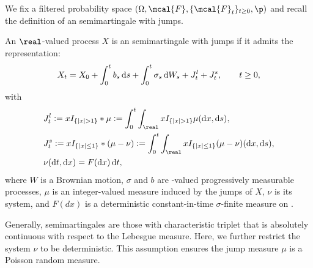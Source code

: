 We fix a filtered probability space $(\Omega, \mcal{F}, \{\mcal{F}_t\}_{t \ge 0}, \p)$ and  recall the definition of an \ito semimartingale with \levy jumps.  
\begin{defn}
  An $\real$-valued process $X$ is an \ito semimartingale with \levy jumps if it admits the representation:
  \begin{align}
    X_t = X_0 + \int^t_0 b_s \D s + \int^t_0 \sigma_s \D W_s  + J^l_t + J^s_t, \qquad t \ge 0, 
    \label{eq:semimartingale}
  \end{align}
  with 
  \begin{align}
    & J^l_t := x  I_{\{\vert x \vert > 1\}} \ast \mu := \int_0^t \int_\real x  I_{\{\vert x \vert > 1\}} \mu(\D x, \D s), \notag \\
    & J^s_t := x  I_{\{\vert x \vert \le  1\}} \ast (\mu - \nu) := \int_0^t \int_\real x  I_{\{\vert x \vert \le  1\}}(\mu - \nu)(\D x,  \D s), \notag\\
    &\nu(\D t, \D x) = F(\D x) \D t, \notag
    \label{}
  \end{align}
  where $W$ is a Brownian motion, $\sigma$ and $b$ are \real-valued progressively measurable processes, $\mu$ is an integer-valued measure induced by the jumps  of $X$, $\nu$ is its \levy system, and $F(dx)$ is a  deterministic constant-in-time $\sigma$-finite measure on \real. 
\end{defn}
\begin{remark}
  Generally, \ito semimartingales are those with characteristic triplet  that is absolutely continuous with respect to the Lebesgue measure. Here, we further restrict the \levy system $\nu$ to be deterministic. This assumption ensures the jump measure $\mu$ is a Poisson random measure. 
\end{remark}

